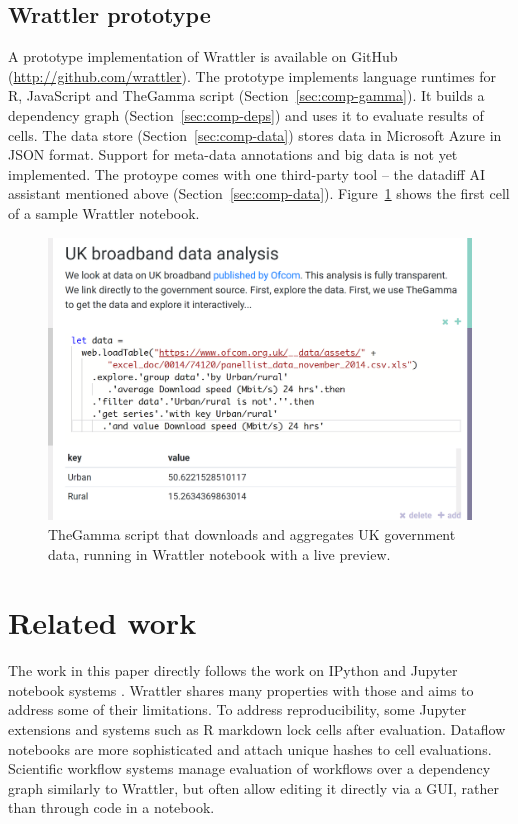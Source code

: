 \documentclass[sigplan]{acmart}\settopmatter{printfolios=true,printccs=false,printacmref=false}
\begin{document}
\subsection{Wrattler prototype}

A prototype implementation of Wrattler is available on GitHub (\url{http://github.com/wrattler}).
The prototype implements language runtimes for R, JavaScript and TheGamma script 
(Section~\ref{sec:comp-gamma}). It builds a dependency graph (Section~\ref{sec:comp-deps})
and uses it to evaluate results of cells. The data store (Section~\ref{sec:comp-data}) 
stores data in Microsoft Azure in JSON format. Support for meta-data annotations and big data
is not yet implemented. The protoype comes with one third-party tool -- the datadiff AI 
assistant mentioned above (Section~\ref{sec:comp-data}). Figure~\ref{fig:proto} shows the 
first cell of a sample Wrattler notebook.

\begin{figure}
\vspace{-0.5em}
\includegraphics[scale=0.15]{screen.png}
\vspace{-0.5em}
\caption{\small{TheGamma script that downloads and aggregates UK government data, running in 
  Wrattler notebook with a live preview.}}
\label{fig:proto}
\end{figure}

\section{Related work}

The work in this paper directly follows the work on IPython and Jupyter notebook systems
\cite{ipython}\cite{jupyter}. Wrattler shares many properties with those and aims to address some
of their limitations. To address reproducibility, some Jupyter extensions and systems such
as R markdown \cite{rmarkdown} lock cells after evaluation. Dataflow notebooks 
\cite{dataflow} are more sophisticated and attach unique hashes to cell evaluations.
Scientific workflow systems \cite{taverna,kepler} manage evaluation of workflows over a 
dependency graph similarly to Wrattler, but often allow editing it directly via a GUI, rather
than through code in a notebook.
\end{document}
